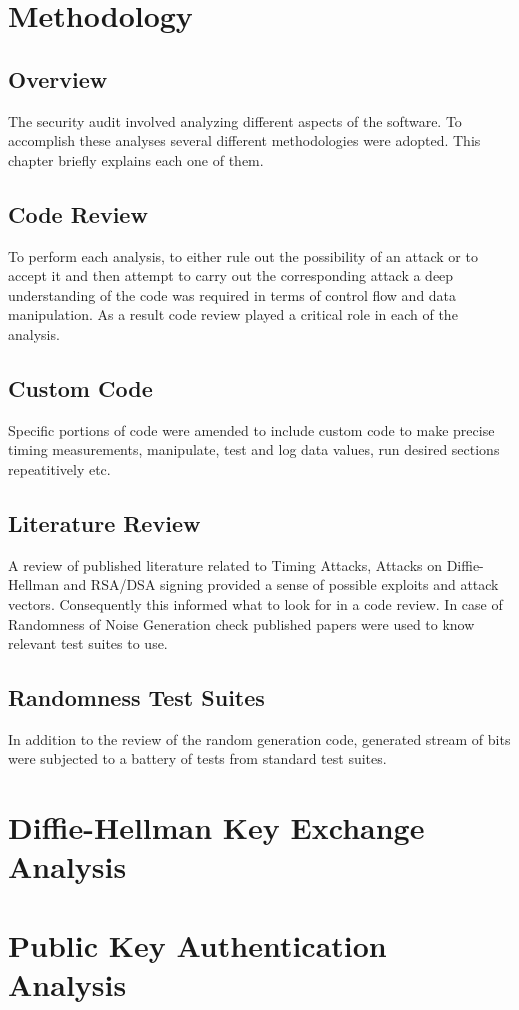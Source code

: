\documentclass{report}
\begin{document}
\chapter{Methodology}
\section{Overview}
The security audit involved analyzing different aspects of the software. To accomplish these analyses several different methodologies were adopted. This chapter briefly explains each one of them.
\section{Code Review}
To perform each analysis, to either rule out the possibility of an attack or to accept it and then attempt to carry out the corresponding attack a deep understanding of the code was required in terms of control flow and data manipulation. As a result code review played a critical role in each of the analysis.
\section{Custom Code}
Specific portions of code were amended to include custom code to make precise timing measurements, manipulate, test and log data values, run desired sections repeatitively etc.
\section{Literature Review}
A review of published literature related to Timing Attacks, Attacks on Diffie-Hellman and RSA/DSA signing provided a sense of possible exploits and attack vectors. Consequently this informed what to look for in a code review. In case of Randomness of Noise Generation check published papers were used to know relevant test suites to use.
\section{Randomness Test Suites}
In addition to the review of the random generation code, generated stream of bits were subjected to a battery of tests from standard test suites.
\chapter{Diffie-Hellman Key Exchange Analysis}
\chapter{Public Key Authentication Analysis}
\end{document}
